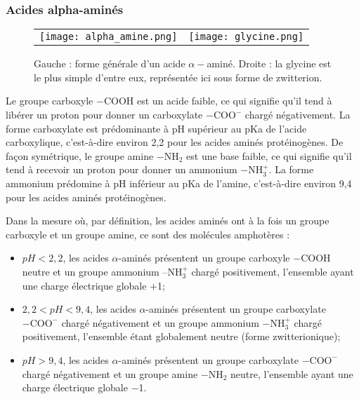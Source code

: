 \documentclass{article}
\begin{document}
\subsubsection*{Acides alpha-aminés}

\begin{figure}[h!]
	\begin{center}
		\begin{tabular}{cc}
  		\texttt{[image: alpha\_amine.png]} &
   		\texttt{[image: glycine.png]}\\
	\end{tabular}
	\caption{Gauche : forme générale d'un acide $\alpha-$aminé. Droite : la glycine est le plus 			simple d'entre eux, représentée ici sous forme de zwitterion.}
	\end{center}
\end{figure}

Le groupe carboxyle $-\text{COOH}$ est un acide faible, ce qui signifie qu'il tend à libérer un proton pour donner un carboxylate $-\text{COO}^-$ chargé négativement. La forme carboxylate est prédominante à pH supérieur au pKa de l'acide carboxylique, c'est-à-dire environ 2,2 pour les acides aminés protéinogènes. De façon symétrique, le groupe amine $-\text{NH}_2$ est une base faible, ce qui signifie qu'il tend à recevoir un proton pour donner un ammonium $-\text{NH}_3^+$. La forme ammonium prédomine à pH inférieur au pKa de l'amine, c'est-à-dire environ 9,4 pour les acides aminés protéinogènes.

Dans la mesure où, par définition, les acides aminés ont à la fois un groupe carboxyle et un groupe amine, ce sont des molécules amphotères :
\begin{itemize}
	\item $pH < 2,2$, les acides $\alpha$-aminés présentent un groupe carboxyle $-\text{COOH}$ neutre et un groupe ammonium $–\text{NH}_3^+$ chargé positivement, l'ensemble ayant une charge électrique globale $+$1;
	\item $2,2 < pH < 9,4$, les acides $\alpha$-aminés présentent un groupe carboxylate $-\text{COO}^-$ chargé négativement et un groupe ammonium $-\text{NH}_3^+$ chargé positivement, l'ensemble étant globalement neutre (forme zwitterionique);
	\item $pH > 9,4$, les acides $\alpha$-aminés présentent un groupe carboxylate $-\text{COO}^-$ chargé négativement et un groupe amine $-\text{NH}_2$ neutre, l'ensemble ayant une charge électrique globale $-$1.
\end{itemize}
\end{document}
